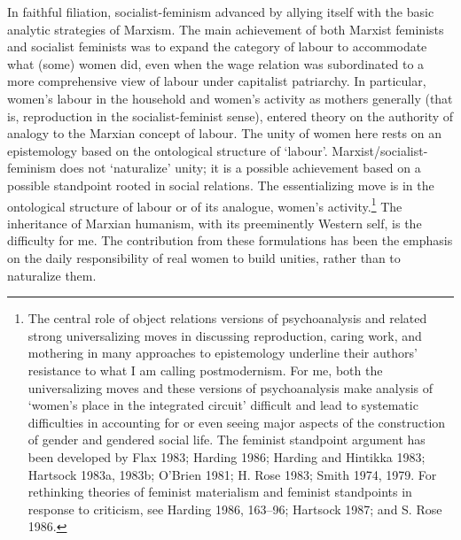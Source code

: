 \documentclass[DIV=12,%
               BCOR=10mm,%
               headinclude=false,%
               footinclude=false,open=any,%
               fontsize=11pt,%
               twoside,%
               paper=210mm:11in]%
               {scrbook}
\newcommand*{\Slash}{\slash\hspace{0pt}}
\begin{document}
In faithful filiation, socialist-feminism advanced by allying itself with the basic analytic strategies of Marxism. The main achievement of both Marxist feminists and socialist feminists was to expand the category of labour to accommodate what (some) women did, even when the wage relation was subordinated to a more comprehensive view of labour under capitalist patriarchy. In particular, women’s labour in the household and women’s activity as mothers generally (that is, reproduction in the socialist-feminist sense), entered theory on the authority of analogy to the Marxian concept of labour. The unity of women here rests on an epistemology based on the ontological structure of ‘labour’. Marxist\Slash{}socialist-feminism does not ‘naturalize’ unity; it is a possible achievement based on a possible standpoint rooted in social relations. The essentializing move is in the ontological structure of labour or of its analogue, women’s activity.\footnote{The central role of object relations versions of psychoanalysis and related strong universalizing moves in discussing reproduction, caring work, and mothering in many approaches to epistemology underline their authors’ resistance to what I am calling postmodernism. For me, both the universalizing moves and these versions of psychoanalysis make analysis of ‘women’s place in the integrated circuit’ difficult and lead to systematic difficulties in accounting for or even seeing major aspects of the construction of gender and gendered social life. The feminist standpoint argument has been developed by Flax 1983; Harding 1986; Harding and Hintikka 1983; Hartsock 1983a, 1983b; O’Brien 1981; H. Rose 1983; Smith 1974, 1979. For rethinking theories of feminist materialism and feminist standpoints in response to criticism, see Harding 1986, 163–96; Hartsock 1987; and S. Rose 1986.} The inheritance of Marxian humanism, with its preeminently Western self, is the difficulty for me. The contribution from these formulations has been the emphasis on the daily responsibility of real women to build unities, rather than to naturalize them.
\end{document}
